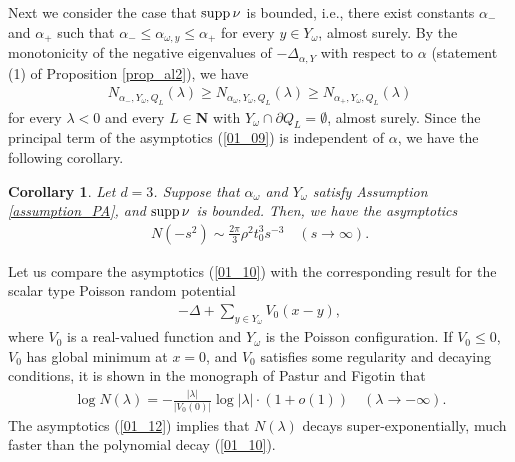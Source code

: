 \documentclass[12pt,a4paper]{article}
\newtheorem{corollary}[theorem]{Corollary}
\def\supp{\mathop{\rm supp}\nolimits}
\begin{document}
Next we consider the case that $\supp \nu$ is bounded,
i.e.,
there exist constants $\alpha_-$ and $\alpha_+$ such that
$\alpha_-\leq \alpha_{\omega, y} \leq \alpha_+$ 
for every $y\in Y_\omega$, almost surely.
By the monotonicity of the negative eigenvalues of $-\Delta_{\alpha,Y}$
with respect to $\alpha$ (statement (1) of Proposition \ref{prop_al2}),
we have
\begin{align*}
 N_{\alpha_-,Y_\omega,Q_L}(\lambda)
\geq
 N_{\alpha_\omega,Y_\omega,Q_L}(\lambda)
\geq
 N_{\alpha_+,Y_\omega,Q_L}(\lambda)
\end{align*}
for every $\lambda<0$ and every $L\in \mathbf{N}$
with $ Y_\omega\cap \partial Q_L=\emptyset$, almost surely.
Since the principal term of the asymptotics (\ref{01_09}) is independent of $\alpha$,
we have the following corollary.
\begin{corollary}
 Let $d=3$.
Suppose that $\alpha_\omega$ and $Y_\omega$ satisfy
Assumption \ref{assumption_PA}, 
and $\supp \nu$ is bounded.
Then, we have the asymptotics
\begin{align}
\label{01_10}
 N(-s^2) \sim \frac{2\pi}{3}\rho^2 t_0^3s^{-3}\quad
(s\to\infty).
\end{align}
\end{corollary}


Let us compare the asymptotics (\ref{01_10}) with 
the corresponding result for the scalar type Poisson random potential
\begin{align}
\label{01_11}
 -\Delta + \sum_{y\in Y_\omega}V_0(x-y),
\end{align}
where 
$V_0$ is a real-valued function and 
$Y_\omega$ is the Poisson configuration.
If $V_0\leq 0$, $V_0$ has global minimum at $x=0$,
and $V_0$ satisfies some regularity and decaying conditions, 
it is shown in the monograph of Pastur and Figotin
\cite[Theorem 9.4]{Pa-Fi} that
\begin{align}
\label{01_12}
 \log N(\lambda) = -\frac{|\lambda|}{|V_0(0)|}\log|\lambda|\cdot (1+o(1))
\quad(\lambda \to -\infty).
\end{align}
The asymptotics (\ref{01_12}) implies that $N(\lambda)$ decays super-exponentially,
much faster than the polynomial decay (\ref{01_10}).
\end{document}
